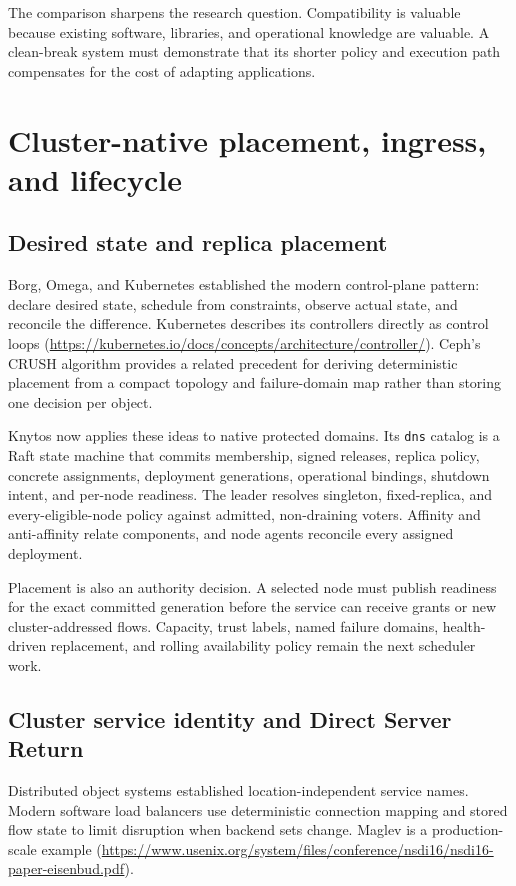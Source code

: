 The comparison sharpens the research question. Compatibility is valuable
because existing software, libraries, and operational knowledge are valuable.
A clean-break system must demonstrate that its shorter policy and execution
path compensates for the cost of adapting applications.

\section{Cluster-native placement, ingress, and lifecycle}

\subsection{Desired state and replica placement}

Borg, Omega, and Kubernetes established the modern control-plane pattern:
declare desired state, schedule from constraints, observe actual state, and
reconcile the difference. Kubernetes describes its controllers directly as
control loops
(\url{https://kubernetes.io/docs/concepts/architecture/controller/}). Ceph's
CRUSH algorithm provides a related precedent for deriving deterministic
placement from a compact topology and failure-domain map rather than storing
one decision per object.

Knytos now applies these ideas to native protected domains. Its
\texttt{dns} catalog is a Raft state machine that commits membership, signed
releases, replica policy, concrete assignments, deployment generations,
operational bindings, shutdown intent, and per-node readiness. The leader
resolves singleton, fixed-replica, and every-eligible-node policy against
admitted, non-draining voters. Affinity and anti-affinity relate components,
and node agents reconcile every assigned deployment.

Placement is also an authority decision. A selected node must publish readiness
for the exact committed generation before the service can receive grants or new
cluster-addressed flows. Capacity, trust labels, named failure domains,
health-driven replacement, and rolling availability policy remain the next
scheduler work.

\subsection{Cluster service identity and Direct Server Return}

Distributed object systems established location-independent service names.
Modern software load balancers use deterministic connection mapping and
stored flow state to limit disruption when backend sets change. Maglev is a
production-scale example
(\url{https://www.usenix.org/system/files/conference/nsdi16/nsdi16-paper-eisenbud.pdf}).


